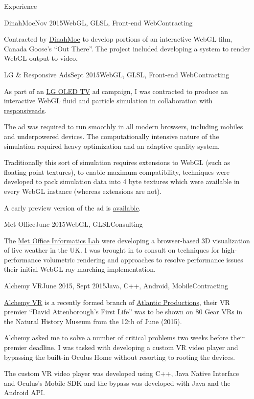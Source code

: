 \documentclass{resume} %
\begin{document}
\begin{rSection}{Experience}
\begin{rSubsection}{DinahMoe}{Nov 2015}{WebGL, GLSL, Front-end Web}{Contracting}
\item Contracted by \href{http://dinahmoe.com/}{DinahMoe} to develop portions of an interactive WebGL film, Canada Goose's ``Out There''. The project included developing a system to render WebGL output to video.
\end{rSubsection}

\begin{rSubsection}{LG \& Responsive Ads}{Sept 2015}{WebGL, GLSL, Front-end Web}{Contracting}
\item As part of an \href{http://www.lg.com/uk/oled-tv}{LG OLED TV} ad campaign, I was contracted to produce an interactive WebGL fluid and particle simulation in collaboration with \href{http://www.responsiveads.com/}{responsiveads}.
\item The ad was required to run smoothly in all modern browsers, including mobiles and underpowered devices. The computationally intensive nature of the simulation required heavy optimization and an adaptive quality system.
\item Traditionally this sort of simulation requires extensions to WebGL (such as floating point textures), to enable maximum compatibility, techniques were developed to pack simulation data into 4 byte textures which were available in every WebGL instance (whereas extensions are not).
\item A early preview version of the ad is \href{http://haxiomic.github.io/ig783wghhnod/new-brush/}{available}.
\end{rSubsection}

\begin{rSubsection}{Met Office}{June 2015}{WebGL, GLSL}{Consulting}
\item The \href{http://www.informaticslab.co.uk/}{Met Office Informatics Lab} were developing a browser-based 3D visualization of live weather in the UK. I was brought in to consult on techniques for high-performance volumetric rendering and approaches to resolve performance issues their initial WebGL ray marching implementation.
\end{rSubsection}

\begin{rSubsection}{Alchemy VR}{June 2015, Sept 2015}{Java, C++, Android, Mobile}{Contracting}
\item \href{http://www.alchemyvr.com/}{Alchemy VR} is a recently formed branch of \href{http://www.atlanticproductions.tv/}{Atlantic Productions}, their VR premier ``David Attenborough's First Life'' was to be shown on 80 Gear VRs in the Natural History Museum from the 12th of June (2015).
\item Alchemy asked me to solve a number of critical problems two weeks before their premier deadline. I was tasked with developing a custom VR video player and bypassing the built-in Oculus Home without resorting to rooting the devices.
\item The custom VR video player was developed using C++, Java Native Interface and Oculus's Mobile SDK and the bypass was developed with Java and the Android API.
\end{rSubsection}


\end{rSection}
\end{document}

